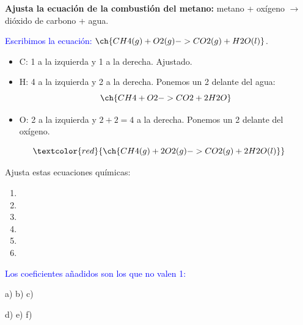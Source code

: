 \begin{example}
    \textbf{Ajusta la ecuación de la combustión del metano:} metano + oxígeno \(\to\) dióxido de carbono + agua.

    \textcolor{blue}{Escribimos la ecuación:} \(\ch{CH4 (g) + O2 (g) -> CO2 (g) + H2O (l)}\).
    \begin{itemize}
        \item C: 1 a la izquierda y 1 a la derecha. Ajustado.
        \item H: 4 a la izquierda y 2 a la derecha. Ponemos un 2 delante del agua:
        \[ \ch{CH4 + O2 -> CO2 + 2 H2O} \]
        \item O: 2 a la izquierda y \(2 + 2 = 4\) a la derecha. Ponemos un 2 delante del oxígeno.
    \end{itemize}
    \[ \textcolor{red}{\ch{CH4 (g) + 2 O2 (g) -> CO2 (g) + 2 H2O (l)}} \]
\end{example}

\begin{exercise}
    Ajusta estas ecuaciones químicas:
    \begin{enumerate}[label=\alph*)]
        \item {}
        \item {}
        \item {}
        \item {}
        \item {}
        \item {}
    \end{enumerate}
    \begin{solu}
        \textcolor{blue}{Los coeficientes añadidos son los que no valen 1:}

        a) 
        \quad b) 
        \quad c) 

        d) 
        \quad e) 
        \quad f) 
    \end{solu}
\end{exercise}

